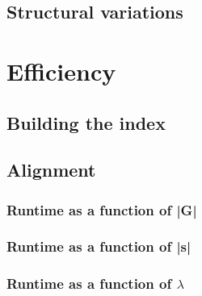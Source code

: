\documentclass[thesis.tex]{subfiles}
\begin{document}
\subsection{Structural variations}
\section{Efficiency}
\subsection{Building the index}
\subsection{Alignment}
\subsubsection{Runtime as a function of |G|}
\subsubsection{Runtime as a function of |s|}
\subsubsection{Runtime as a function of $\lambda$}
\end{document}
